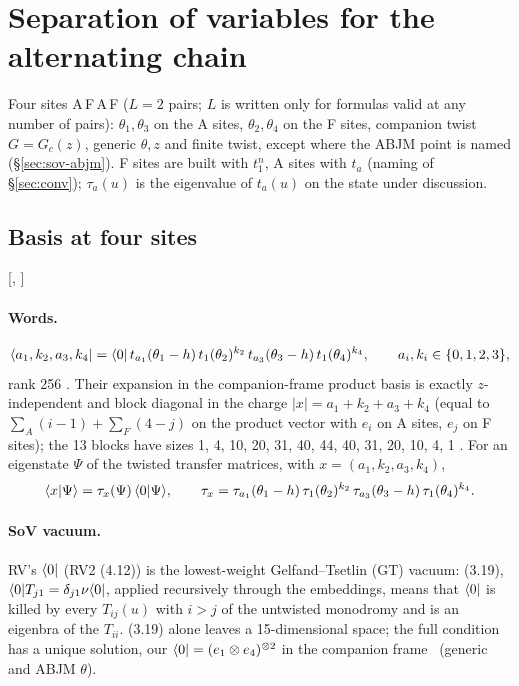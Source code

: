 \section{Separation of variables for the alternating chain}\label{sec:sov}
\providecommand{\sovT}{\tilde\tau}
\providecommand{\sovL}{\Psi^{\mathrm L}}

Four sites A\,F\,A\,F ($L=2$ pairs; $L$ is written only for formulas valid at any number of pairs): $\theta_1,\theta_3$ on the A sites,
$\theta_2,\theta_4$ on the F sites, companion twist $G=G_c(z)$, generic $\theta,z$ and finite twist, except where the ABJM point is named
(\S\ref{sec:sov-abjm}). F sites are built with $t_1^n$, A sites with $t_a$ (naming of \S\ref{sec:conv}); $\tau_a(u)$ is the eigenvalue of
$t_a(u)$ on the state under discussion.

\subsection{Basis at four sites}\label{sec:sov-basis}

[, ]

\paragraph{Words.}
\begin{equation}\label{eq:sov-words}
 \langle a_1,k_2,a_3,k_4|=\langle0|\,t_{a_1}(\theta_1-h)\,t_1(\theta_2)^{k_2}\,t_{a_3}(\theta_3-h)\,t_1(\theta_4)^{k_4},\qquad a_i,k_i\in\{0,1,2,3\},
\end{equation}
rank 256 \ex. Their expansion in the companion-frame product basis is exactly $z$-independent and block diagonal in the charge
$|x|=a_1+k_2+a_3+k_4$ (equal to $\sum_{A}(i-1)+\sum_{F}(4-j)$ on the product vector with $e_i$ on A sites, $e_j$ on F sites); the 13 blocks have sizes
1, 4, 10, 20, 31, 40, 44, 40, 31, 20, 10, 4, 1 \ex. For an eigenstate $\Psi$ of the twisted transfer matrices, with $x=(a_1,k_2,a_3,k_4)$,
\begin{equation}\label{eq:sov-wavefn}
 \langle x|\Psi\rangle=\tau_x(\Psi)\,\langle0|\Psi\rangle,\qquad
 \tau_x=\tau_{a_1}(\theta_1-h)\,\tau_1(\theta_2)^{k_2}\,\tau_{a_3}(\theta_3-h)\,\tau_1(\theta_4)^{k_4}.
\end{equation}

\paragraph{SoV vacuum.} RV's $\langle0|$ (RV2 (4.12)) is the lowest-weight Gelfand--Tsetlin (GT) vacuum: (3.19), $\langle0|T_{j1}=\delta_{j1}\nu\langle0|$, applied recursively through the embeddings, means that
$\langle0|$ is killed by every $T_{ij}(u)$ with $i>j$ of the untwisted monodromy and is an eigenbra of the $T_{ii}$. (3.19) alone leaves a 15-dimensional space; the full condition has a unique
solution, our $\langle0|=(e_1\otimes e_4)^{\otimes2}$ in the companion frame \ex\ (generic and ABJM $\theta$).

